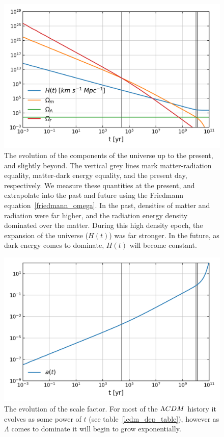 \begin{figure}[!pth]
\centering     %
    \includegraphics[width=.75\columnwidth]{plots/lcdm_components.png}
\caption{
    The evolution of the components of the universe up to the present, and slightly beyond.
    The vertical grey lines mark matter-radiation equality, matter-dark energy equality,
    and the present day, respectively. We measure these quantities at the present, and
    extrapolate into the past and future using the Friedmann equation~\eqref{friedmann_omega}.
    In the past, densities of matter and radiation were
    far higher, and the radiation energy density dominated over the matter.
    During this high density epoch, the expansion of the universe ($H(t)$) was far stronger.
    In the future, as dark energy comes to dominate, $H(t)$ will become constant.
}\label{fig:lcdm_components}
\end{figure}
\begin{figure}[!pth]
\centering     %
    \includegraphics[width=.75\columnwidth]{plots/lcdm_a.png}
\caption{
    The evolution of the scale factor. For most of the $\Lambda CDM$ history
    it evolves as some power of $t$ (see table~\ref{lcdm_dep_table}),
    however as $\Lambda$ comes to dominate
    it will begin to grow exponentially.
}\label{fig:lcdm_a}
\end{figure}
